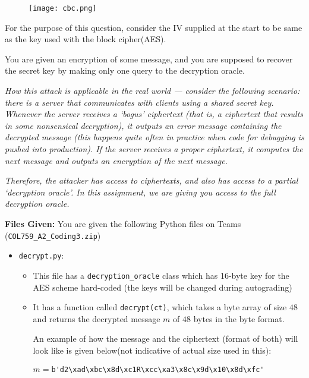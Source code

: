 \documentclass[11pt]{article}
\begin{document}
\begin{enumerate}
        \begin{figure}[h]
            \centering
            \texttt{[image: cbc.png]}
        \end{figure}

        For the purpose of this question, consider the IV supplied at the start to be same as the key used with the block cipher(AES).

        You are given an encryption of some message, and you are supposed to recover the secret key by making only one query to the decryption oracle. 

        \emph{How this attack is applicable in the real world --- consider the following scenario: there is a server that communicates with clients using a shared secret key. Whenever the server receives a `bogus' ciphertext (that is, a ciphertext that results in some nonsensical decryption), it outputs an error message containing the decrypted message (this happens quite often in practice when code for debugging is pushed into production). If the server receives a proper ciphertext, it computes the next message and outputs an encryption of the next message. }

        \emph{Therefore, the attacker has access to ciphertexts, and also has access to a partial `decryption oracle'. In this assignment, we are giving you access to the full decryption oracle. }

        \textbf{Files Given:} You are given the following Python files on Teams (\texttt{COL759\_A2\_Coding3.zip})
            \begin{itemize}
                \item \texttt{decrypt.py}:
                    \begin{itemize}
                        \item This file has a \texttt{decryption\_oracle} class which has 16-byte key for the AES scheme hard-coded (the keys will be changed during autograding)
                        \item It has a function called \texttt{decrypt(ct)}, which takes a byte array of size $48$ and returns the decrypted message $m$ of $48$ bytes in the byte format.
                        
                        An example of how the message and the ciphertext (format of both) will look like is given below(not indicative of actual size used in this):
                        
                        $m = $\verb|b'd2\xad\xbc\x8d\xc1R\xcc\xa3\x8c\x9d\x10\x8d\xfc'|
                        

\end{itemize}
\end{itemize}
\end{enumerate}
\end{document}
